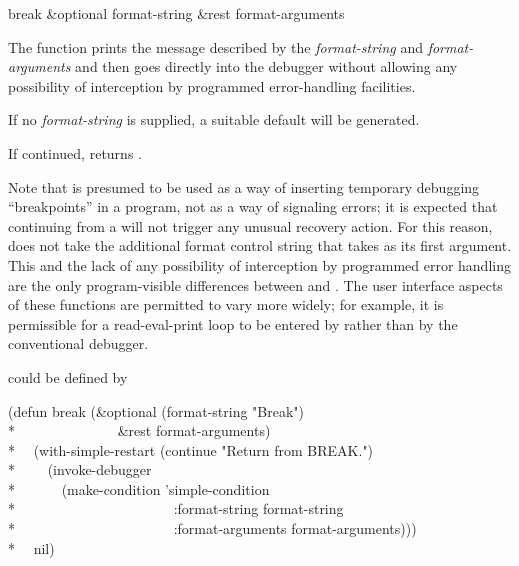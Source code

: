 \begin{defun}[Function]
break &optional format-string &rest format-arguments

The function  prints the message described by the
\emph{format-string} and \emph{format-arguments} and then goes directly into the
debugger without allowing any possibility of interception by programmed
error-handling facilities.

If no \emph{format-string} is supplied, a suitable default will be generated.

If continued,  returns .

Note that  is presumed to be used as a way of inserting temporary
debugging ``breakpoints'' in a program, not as a way of signaling errors; it is
expected that continuing from a  will not trigger any unusual
recovery action. For this reason,  does not take the additional
format control string that  takes as its first argument. This and
the lack of any possibility of interception by programmed error handling are the
only program-visible differences between  and . The user
interface aspects of these functions are permitted to vary more widely; for
example, it is permissible for a read-eval-print loop to be entered by
 rather than by the conventional debugger.

 could be defined by
\begin{lisp}
(defun break (\&optional (format-string "Break") \\*
~~~~~~~~~~~~~~\&rest format-arguments) \\*
~~(with-simple-restart (continue "Return from BREAK.") \\*
~~~~(invoke-debugger \\*
~~~~~~(make-condition 'simple-condition \\*
~~~~~~~~~~~~~~~~~~~~~~:format-string format-string \\*
~~~~~~~~~~~~~~~~~~~~~~:format-arguments format-arguments))) \\*
~~nil)
\end{lisp}
\end{defun}

